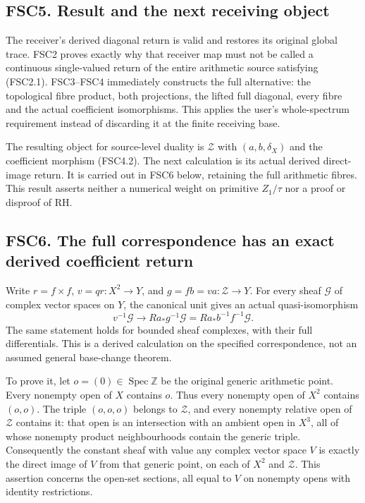 \subsection{FSC5. Result and the next receiving
object}\label{fsc5.-result-and-the-next-receiving-object}

The receiver's derived diagonal return is valid and restores its
original global trace. FSC2 proves exactly why that receiver map must
not be called a continuous single-valued return of the entire arithmetic
source satisfying (FSC2.1). FSC3--FSC4 immediately constructs the full
alternative: the topological fibre product, both projections, the lifted
full diagonal, every fibre and the actual coefficient isomorphisms. This
applies the user's whole-spectrum requirement instead of discarding it
at the finite receiving base.

The resulting object for source-level duality is \(\mathcal Z\) with
\((a,b,\delta_X)\) and the coefficient morphism (FSC4.2). The next
calculation is its actual derived direct-image return. It is carried out
in FSC6 below, retaining the full arithmetic fibres. This result asserts
neither a numerical weight on primitive \(Z_1/\tau\) nor a proof or
disproof of RH.

\subsection{FSC6. The full correspondence has an exact derived
coefficient
return}\label{fsc6.-the-full-correspondence-has-an-exact-derived-coefficient-return}

Write \(r=f\times f\), \(v=qr:X^2\to Y\), and
\(g=fb=va:\mathcal Z\to Y\). For every sheaf \(\mathcal G\) of complex
vector spaces on \(Y\), the canonical unit gives an actual
quasi-isomorphism \[
\boxed{v^{-1}\mathcal G\longrightarrow Ra_*g^{-1}\mathcal G
=Ra_*b^{-1}f^{-1}\mathcal G.}
\tag{FSC6.1}
\] The same statement holds for bounded sheaf complexes, with their full
differentials. This is a derived calculation on the specified
correspondence, not an assumed general base-change theorem.

To prove it, let \(o=(0)\in\operatorname{Spec}\mathbb Z\) be the
original generic arithmetic point. Every nonempty open of \(X\) contains
\(o\). Thus every nonempty open of \(X^2\) contains \((o,o)\). The
triple \((o,o,o)\) belongs to \(\mathcal Z\), and every nonempty
relative open of \(\mathcal Z\) contains it: that open is an
intersection with an ambient open in \(X^3\), all of whose nonempty
product neighbourhoods contain the generic triple. Consequently the
constant sheaf with value any complex vector space \(V\) is exactly the
direct image of \(V\) from that generic point, on each of \(X^2\) and
\(\mathcal Z\). This assertion concerns the open-set sections, all equal
to \(V\) on nonempty opens with identity restrictions.

